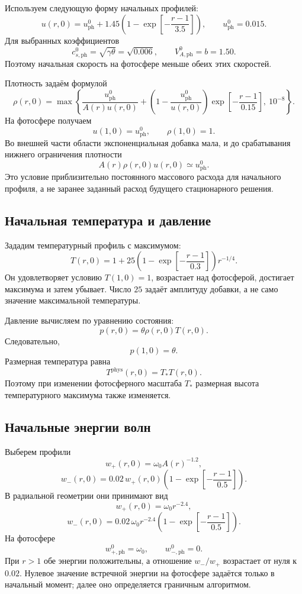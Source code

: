 \documentclass[11pt,a4paper]{article}
\begin{document}
Используем следующую форму начальных профилей:
\[
u(r,0)
=
u_{\mathrm{ph}}^0
+1.45\left(1-\exp\!\left[-\frac{r-1}{3.5}\right]\right),
\qquad
u_{\mathrm{ph}}^0=0.015.
\]
Для выбранных коэффициентов
\[
c_{s,\mathrm{ph}}^0=\sqrt{\gamma\theta}
=\sqrt{0.006},
\qquad
V_{A,\mathrm{ph}}^0=b=1.50.
\]
Поэтому начальная скорость на фотосфере
меньше обеих этих скоростей.

Плотность задаём формулой
\[
\rho(r,0)
=
\max\!\left\{
\frac{u_{\mathrm{ph}}^0}{A(r)u(r,0)}
+
\left(1-\frac{u_{\mathrm{ph}}^0}{u(r,0)}\right)
\exp\!\left[-\frac{r-1}{0.15}\right],
\ 10^{-8}
\right\}.
\]
На фотосфере получаем
\[
u(1,0)=u_{\mathrm{ph}}^0,\qquad
\rho(1,0)=1.
\]
Во внешней части области экспоненциальная добавка мала,
и до срабатывания нижнего ограничения плотности
\[
A(r)\rho(r,0)u(r,0)\simeq u_{\mathrm{ph}}^0.
\]
Это условие приблизительно постоянного массового расхода
для начального профиля, а не заранее заданный расход
будущего стационарного решения.

\subsection{Начальная температура и давление}

Зададим температурный профиль с максимумом:
\[
T(r,0)
=
1+25
\left(1-\exp\!\left[-\frac{r-1}{0.3}\right]\right)
r^{-1/4}.
\]
Он удовлетворяет условию $T(1,0)=1$,
возрастает над фотосферой,
достигает максимума и затем убывает.
Число $25$ задаёт амплитуду добавки,
а не само значение максимальной температуры.

Давление вычисляем по уравнению состояния:
\[
p(r,0)=\theta\rho(r,0)T(r,0).
\]
Следовательно,
\[
p(1,0)=\theta.
\]
Размерная температура равна
\[
T^{\mathrm{phys}}(r,0)=T_*T(r,0).
\]
Поэтому при изменении фотосферного масштаба $T_*$
размерная высота температурного максимума
также изменяется.

\subsection{Начальные энергии волн}

Выберем профили
\[
w_+(r,0)=\omega_0 A(r)^{-1.2},
\]
\[
w_-(r,0)
=
0.02\,w_+(r,0)
\left(1-\exp\!\left[-\frac{r-1}{0.5}\right]\right).
\]
В радиальной геометрии они принимают вид
\[
w_+(r,0)=\omega_0 r^{-2.4},
\]
\[
w_-(r,0)
=
0.02\,\omega_0 r^{-2.4}
\left(1-\exp\!\left[-\frac{r-1}{0.5}\right]\right).
\]
На фотосфере
\[
w_{+,\mathrm{ph}}^0=\omega_0,\qquad
w_{-,\mathrm{ph}}^0=0.
\]
При $r>1$ обе энергии положительны,
а отношение $w_-/w_+$ возрастает от нуля к $0.02$.
Нулевое значение встречной энергии на фотосфере
задаётся только в начальный момент;
далее оно определяется граничным алгоритмом.
\end{document}
